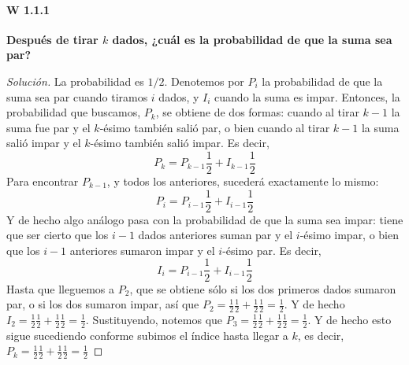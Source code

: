 \documentclass[spanish]{book}
\theoremstyle{definition}
\begin{document}
\paragraph{W  1.1.1}\textbf{Después de tirar $k$ dados, ¿cuál es la probabilidad de que la suma sea par?}
\begin{proof}[Solución]
	La probabilidad es $1/2$. Denotemos por $P_i$ la probabilidad de que la suma sea par cuando tiramos $i$ dados, y $I_i$ cuando la suma es impar. Entonces, la probabilidad que buscamos, $P_k$, se obtiene de dos formas: cuando al tirar $k-1$ la suma fue par y el $k$-ésimo también salió par, o bien cuando al tirar $k-1$ la suma salió impar y el $k$-ésimo también salió impar. Es decir,
	\[P_k=P_{k-1}\frac{1}{2}+I_{k-1}\frac{1}{2}\]
	Para encontrar $P_{k-1}$, y todos los anteriores, sucederá exactamente lo mismo: \[P_i=P_{i-1}\frac{1}{2}+I_{i-1}\frac{1}{2}\]
	Y de hecho algo análogo pasa con la probabilidad de que la suma sea impar: tiene que ser cierto que los $i-1$ dados anteriores suman par y el $i$-ésimo impar, o bien que los $i-1$ anteriores sumaron impar y el $i$-ésimo par. Es decir, \[I_i=P_{i-1}\frac{1}{2}+I_{i-1}\frac{1}{2}\]
	Hasta que lleguemos a $P_2$, que se obtiene sólo si los dos primeros dados sumaron par, o si los dos sumaron impar, así que $P_2=\frac{1}{2}\frac{1}{2}+\frac{1}{2}\frac{1}{2}=\frac{1}{2}$. Y de hecho $I_2=\frac{1}{2}\frac{1}{2}+\frac{1}{2}\frac{1}{2}=\frac{1}{2}$. Sustituyendo, notemos que $P_3=\frac{1}{2}\frac{1}{2}+\frac{1}{2}\frac{1}{2}=\frac{1}{2}$. Y de hecho esto sigue sucediendo conforme subimos el índice hasta llegar a $k$, es decir, $P_k=\frac{1}{2}\frac{1}{2}+\frac{1}{2}\frac{1}{2}=\frac{1}{2}$
\end{proof}
\end{document}
